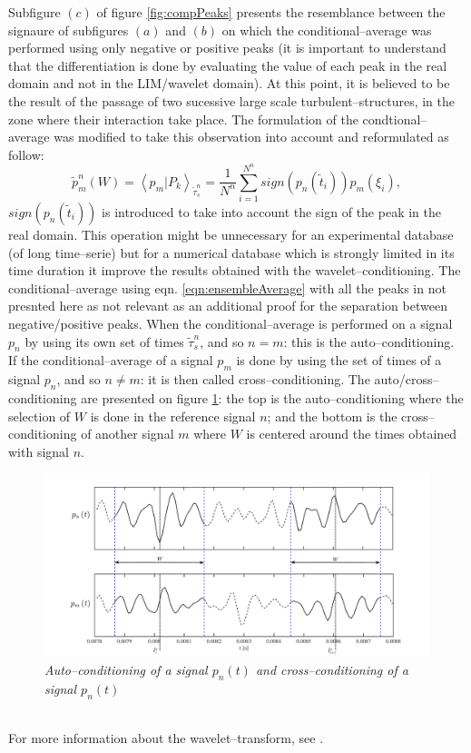 \documentclass[english]{aiaa-tc}
\begin{document}
Subfigure $(c)$ of figure \ref{fig:compPeaks} presents the resemblance between the signaure of subfigures $(a)$ and $(b)$ on which the conditional--average was performed using only negative or positive peaks (it is important to understand that the differentiation is done by evaluating the value of each peak in the real domain and not in the LIM/wavelet domain). At this point, it is believed to be the result of the passage of two sucessive large scale turbulent--structures, in the zone where their interaction take place.
The formulation of the condtional--average was modified to take this observation into account and reformulated as follow:
\begin{equation} \label{eqn:condAvgSign}
  \tilde{p}_{m}^n\left( W \right) = \left< p_{m} | P_{k} \right>_{\tilde{\tau}^n_{s}} = \frac{1}{N^n} \sum^{N^n}_{i = 1} sign\left( p_{n} \left( \tilde{t}_{i} \right) \right) p_{m} \left( \xi_{i} \right),
\end{equation}
$sign\left( p_{n} \left( \tilde{t}_{i} \right) \right)$ is introduced to take into account the sign of the peak in the real domain. This operation might be unnecessary for an experimental database (of long time--serie) but for a numerical database which is strongly limited in its time duration it improve the results obtained with the wavelet--conditioning.
The conditional--average using eqn. \ref{eqn:ensembleAverage} with all the peaks in not presnted here as not relevant as an additional proof for the separation between negative/positive peaks.
When the conditional--average is performed on a signal $p_{n}$ by using its own set of times ${\tilde{\tau}^n_{s}}$, and so $n = m$: this is the auto--conditioning. If the conditional--average of a signal $p_{m}$ is done by using the set of times of a signal $p_{n}$, and so $n \neq m$: it is then called cross--conditioning. The auto/cross--conditioning are presented on figure  \ref{fig:condNcond}: the top is the auto--conditioning where the selection of $W$ is done in the reference signal $n$; and the bottom is the cross--conditioning of another signal $m$ where $W$ is centered around the times obtained with signal $n$.
 \begin{figure}[!ht]
\centering
    \includegraphics[width=1\textwidth]{figures/pdf/condNcond}
\caption{\textit{Auto--conditioning of a signal $p_n(t)$ and cross--conditioning of a signal $p_n(t)$}}
\label{fig:condNcond}
\end{figure} \\
For more information about the wavelet--transform, see \cite{Farge1992}.
\end{document}
